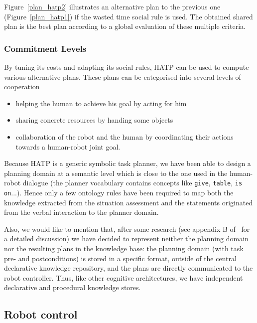 \documentclass[preprint,3p,times]{elsarticle}
\begin{document}
Figure~\ref{plan_hatp2} illustrates an alternative plan to the previous 
one (Figure~\ref{plan_hatp1}) if the wasted time social rule is used.
The obtained shared plan is the best plan according to a global evaluation of
these multiple criteria.

\subsubsection{Commitment Levels}

By tuning its costs and adapting its social rules, HATP can be used to compute
various alternative plans. These plans can be categorised into several levels of
cooperation

\begin{itemize}
\item helping the human to achieve his goal by acting for him
\item sharing concrete resources by handing some objects
\item collaboration of the robot and the human by coordinating their
  actions towards a human-robot joint goal.
\end{itemize}


Because HATP is a generic symbolic task planner, we have been able to design a
planning domain at a semantic level which is close to the one used in the
human-robot dialogue (the planner vocabulary contains concepts like
\texttt{give}, \texttt{table}, \texttt{is on}...). Hence only a few ontology
rules have been required to map both the knowledge extracted from the situation
assessment and the statements originated from the verbal interaction to the
planner domain.

Also, we would like to mention that, after some research (see appendix B
of~\cite{Lemaignan2012a} for a detailed discussion)  we have decided to
represent neither the planning domain nor the resulting plans in the knowledge
base: the planning domain (with task pre- and postconditions) is stored in a
specific format, outside of the central declarative knowledge repository, and
the plans are directly communicated to the robot controller. Thus, like other
cognitive architectures, we have independent declarative and procedural
knowledge stores.


\subsection{Robot control}
\label{sect|ctrl}
\end{document}
